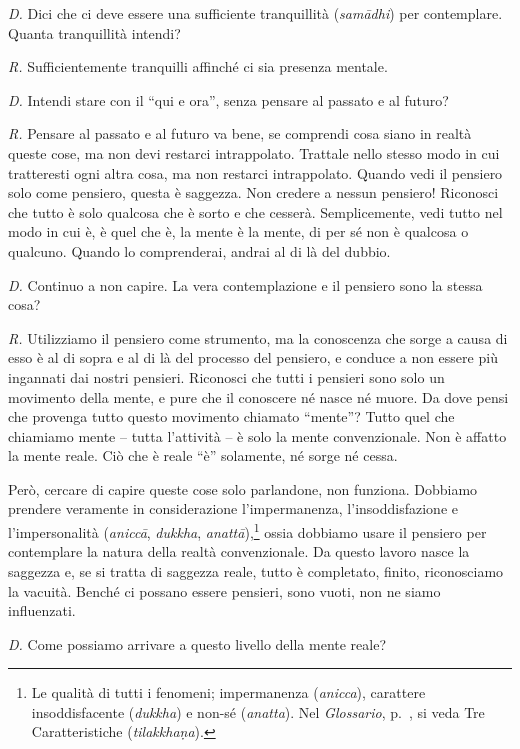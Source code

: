 \emph{D.} Dici che ci deve essere una sufficiente tranquillità
(\emph{samādhi}) per contemplare. Quanta tranquillità intendi?

\emph{R.} Sufficientemente tranquilli affinché ci sia presenza mentale.

\emph{D.} Intendi stare con il ``qui e ora'', senza pensare al passato e al
futuro?

\emph{R.} Pensare al passato e al futuro va bene, se comprendi cosa siano in
realtà queste cose, ma non devi restarci intrappolato. Trattale nello
stesso modo in cui tratteresti ogni altra cosa, ma non restarci
intrappolato. Quando vedi il pensiero solo come pensiero, questa è
saggezza. Non credere a nessun pensiero! Riconosci che tutto è solo
qualcosa che è sorto e che cesserà. Semplicemente, vedi tutto nel modo
in cui è, è quel che è, la mente è la mente, di per sé non è qualcosa o
qualcuno. Quando lo comprenderai, andrai al di là del dubbio.

\emph{D.} Continuo a non capire. La vera contemplazione e il pensiero sono la
stessa cosa?

\emph{R.} Utilizziamo il pensiero come strumento, ma la conoscenza che sorge a
causa di esso è al di sopra e al di là del processo del pensiero, e
conduce a non essere più ingannati dai nostri pensieri. Riconosci che
tutti i pensieri sono solo un movimento della mente, e pure che il
conoscere né nasce né muore. Da dove pensi che provenga tutto questo
movimento chiamato ``mente''? Tutto quel che chiamiamo mente -- tutta
l'attività -- è solo la mente convenzionale. Non è affatto la mente
reale. Ciò che è reale ``è'' solamente, né sorge né cessa.

Però, cercare di capire queste cose solo parlandone, non funziona.
Dobbiamo prendere veramente in considerazione l'impermanenza,
l'insoddisfazione e l'impersonalità (\emph{aniccā}, \emph{dukkha},
\emph{anattā}),\footnote{Le qualità di tutti i fenomeni; impermanenza
  (\emph{anicca}), carattere insoddisfacente (\emph{dukkha}) e non-sé
  (\emph{anatta}). Nel \emph{Glossario}, p.~\pageref{glossary-tilakkhana}, si veda Tre Caratteristiche
  (\emph{tilakkhaṇa}).} ossia dobbiamo usare il pensiero per contemplare
la natura della realtà convenzionale. Da questo lavoro nasce la saggezza
e, se si tratta di saggezza reale, tutto è completato, finito,
riconosciamo la vacuità. Benché ci possano essere pensieri, sono vuoti,
non ne siamo influenzati.

\emph{D.} Come possiamo arrivare a questo livello della mente reale?

